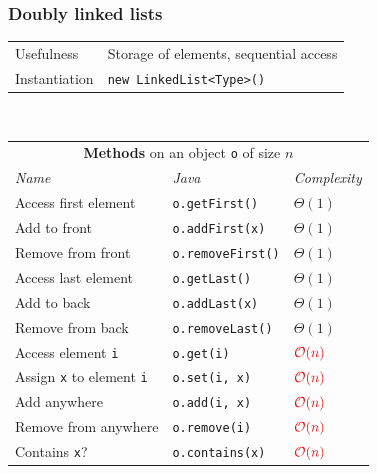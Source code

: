 \documentclass[8pt,aspectratio=169]{beamer}
\begin{document}
\begin{frame}
\frametitle{Doubly linked lists}
\centering
\begin{tabular}{ll}
	Usefulness & Storage of elements, sequential access\\
	Instantiation & \texttt{new LinkedList<Type>()}\\
\end{tabular}\\
\vspace{0.5cm}
\centering
\begin{tabular}{lll}
	\multicolumn{3}{c}{\textbf{Methods} on an object \texttt{o} of size $n$} \\
	\textit{Name} & \textit{Java} & \textit{Complexity} \\
	Access first element & \texttt{o.getFirst()} & $\Theta(1)$\\
	Add to front & \texttt{o.addFirst(x)} & $\Theta(1)$\\
	Remove from front & \texttt{o.removeFirst()} & $\Theta(1)$\\
	Access last element & \texttt{o.getLast()} & $\Theta(1)$\\
	Add to back & \texttt{o.addLast(x)} & $\Theta(1)$\\
	Remove from back & \texttt{o.removeLast()} & $\Theta(1)$\\
	Access element \texttt{i} & \texttt{o.get(i)} & $\color{red}\mathcal{O}(n)$\\
	Assign \texttt{x} to element \texttt{i} & \texttt{o.set(i, x)} & $\color{red}\mathcal{O}(n)$\\
	Add anywhere & \texttt{o.add(i, x)} & $\color{red}\mathcal{O}(n)$\\
	Remove from anywhere & \texttt{o.remove(i)} & $\color{red}\mathcal{O}(n)$\\
	Contains \texttt{x}? & \texttt{o.contains(x)} & $\color{red}\mathcal{O}(n)$\\
\end{tabular}
\end{frame}
\end{document}
